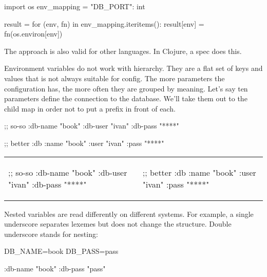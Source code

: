 \begin{python}
import os
env_mapping = {"DB_PORT": int}

result = {}
for (env, fn) in env_mapping.iteritems():
    result[env] = fn(os.environ[env])
\end{python}

The approach is also valid for other languages. In Clojure, a spec does this.

Environment variables do not work with hierarchy. They are a flat set of keys and values that is not always suitable for config. The more parameters the configuration has, the more often they are grouped by meaning. Let's say ten parameters define the connection to the database. We'll take them out to the child map in order not to put a prefix in front of each.


\ifnarrow

\begin{clojure}
;; so-so
{:db-name "book"
 :db-user "ivan"
 :db-pass "****"}
\end{clojure}

\splitter

\begin{clojure}
;; better
{:db {:name "book"
      :user "ivan"
      :pass "****"}}
\end{clojure}

\else


\noindent
\begin{tabular}{ @{}p{5cm} @{}p{5cm} }

\begin{clojure}
;; so-so
{:db-name "book"
 :db-user "ivan"
 :db-pass "****"}
\end{clojure}

&

\begin{clojure}
;; better
{:db {:name "book"
      :user "ivan"
      :pass "****"}}
\end{clojure}

\end{tabular}


\fi

Nested variables are read differently on different systems. For example, a single underscore separates lexemes but does not change the structure. Double underscore stands for nesting:

\ifnarrow

\begin{clojure}
DB_NAME=book
DB_PASS=pass

{:db-name "book"
 :db-pass "pass"}
\end{clojure}

